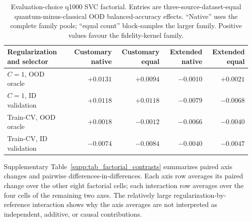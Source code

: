 \documentclass[11pt]{article}
\begin{document}
\begin{table}[htbp]
\centering
\caption{Evaluation-choice q1000 SVC factorial. Entries are three-source-dataset-equal
quantum-minus-classical OOD balanced-accuracy effects. ``Native'' uses the
complete family pools; ``equal count'' block-samples the larger family.
Positive values favour the fidelity-kernel family.}
\label{supp:tab_factorial}
\scriptsize
\setlength{\tabcolsep}{3.5pt}
\begin{tabular}{lrrrr}
\toprule
Regularization and selector & Customary native & Customary equal & Extended native & Extended equal \\
\midrule
$C=1$, OOD oracle & $+0.0131$ & $+0.0094$ & $-0.0010$ & $+0.0021$ \\
$C=1$, ID validation & $+0.0118$ & $+0.0118$ & $-0.0079$ & $-0.0068$ \\
Train-CV, OOD oracle & $+0.0018$ & $-0.0012$ & $-0.0066$ & $-0.0040$ \\
Train-CV, ID validation & $-0.0074$ & $-0.0084$ & $-0.0040$ & $-0.0047$ \\
\bottomrule
\end{tabular}
\end{table}

Supplementary Table~\ref{supp:tab_factorial_contrasts} summarizes paired axis changes and
pairwise differences-in-differences. Each axis row averages its paired change
over the other eight factorial cells; each interaction row averages over the
four cells of the remaining two axes. The relatively large
regularization-by-reference interaction shows why the axis averages are not
interpreted as independent, additive, or causal contributions.
\end{document}
